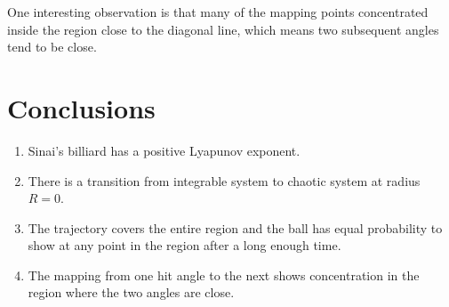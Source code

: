\documentclass[12pt]{article}
\begin{document}
One interesting observation is that many of the mapping points concentrated inside the region close to the diagonal line, which means two subsequent angles tend to 
be close. 

\section*{Conclusions}
\begin{enumerate}
	\item Sinai's billiard has a positive Lyapunov exponent.
	\item There is a transition from integrable system to chaotic system at radius $R = 0$.
	\item The trajectory covers the entire region and the ball has equal probability to show at any point in the region after a long enough time.	\item The mapping from one hit angle to the next shows concentration in the region where the two angles are close.
\end{enumerate}


\newpage
\nocite{chernov2006chaotic, apl2014, backer2007quantum}
\printbibliography
\end{document}
